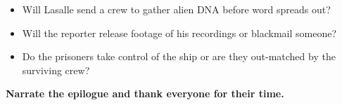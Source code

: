 \begin{rpg-commentbox}{}


\begin{itemize}
    \item Will Lasalle send a crew to gather alien DNA before word spreads out?
    \item Will the reporter release footage of his recordings or blackmail someone?
    \item Do the prisoners take control of the ship or are they out-matched by the surviving crew?
\end{itemize}    

    \medskip

    \textbf{Narrate the epilogue and thank everyone for their time.}
    \end{rpg-commentbox}

    \newsect

    